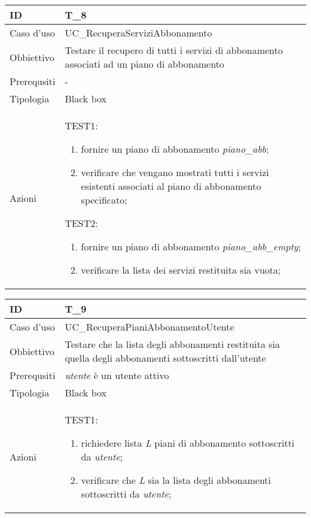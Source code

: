 \begin{table}[hb]
    \centering
    \begin{tabular}{ |p{2cm}|p{10cm}|  }
        \hline
        ID & T\_8 \\\hline
        Caso d'uso & UC\_RecuperaServiziAbbonamento \\\hline   
        Obbiettivo & Testare il recupero di tutti i servizi di abbonamento associati ad un piano di abbonamento \\\hline
        Prerequsiti & - \\\hline
        Tipologia & Black box \\\hline
        Azioni & 
        TEST1:
        \begin{enumerate}[topsep=0pt]
            \item fornire un piano di abbonamento \emph{piano\_abb};
            \item verificare che vengano mostrati tutti i servizi esistenti associati al piano di abbonamento specificato;
        \end{enumerate}
        \vspace{0.5cm} TEST2:
        \begin{enumerate}[topsep=0pt]
            \item fornire un piano di abbonamento \emph{piano\_abb\_empty};
            \item verificare la lista dei servizi restituita sia vuota;
        \end{enumerate}
        \\\hline
    \end{tabular}
\end{table}

\begin{table}[hb]
    \centering
    \begin{tabular}{ |p{2cm}|p{10cm}|  }
        \hline
        ID & T\_9 \\\hline
        Caso d'uso & UC\_RecuperaPianiAbbonamentoUtente \\\hline   
        Obbiettivo & Testare che la lista degli abbonamenti restituita sia quella degli abbonamenti
        sottoscritti dall'utente \\\hline
        Prerequsiti & \emph{utente} è un utente attivo \\\hline
        Tipologia & Black box \\\hline
        Azioni & 
        TEST1:
        \begin{enumerate}[topsep=0pt]
            \item richiedere lista \emph{L} piani di abbonamento sottoscritti da \emph{utente};
            \item verificare che \emph{L} sia la lista degli abbonamenti sottoscritti da \emph{utente};
        \end{enumerate}
        \\\hline
    \end{tabular}
\end{table}

